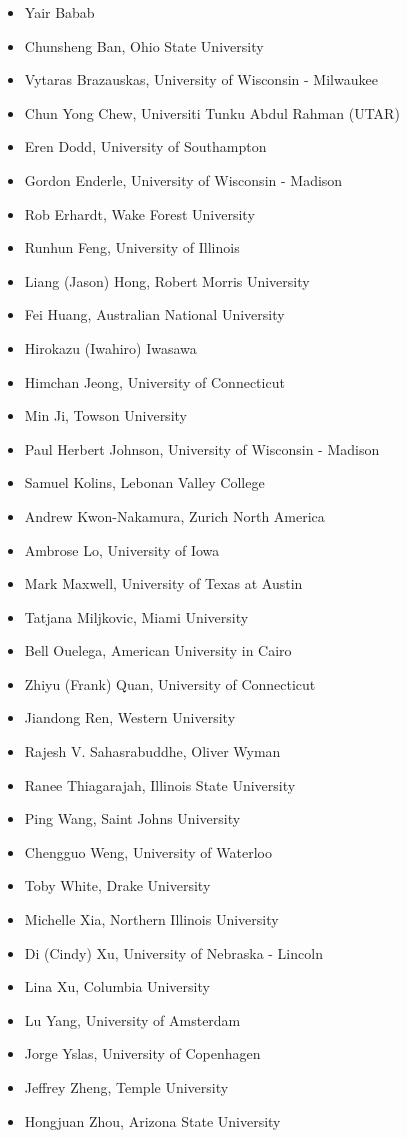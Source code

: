 \documentclass[]{book}
\providecommand{\tightlist}{%
  \setlength{\itemsep}{0pt}\setlength{\parskip}{0pt}}
\begin{document}
\begin{itemize}
\tightlist
\item
  Yair Babab
\item
  Chunsheng Ban, Ohio State University
\item
  Vytaras Brazauskas, University of Wisconsin - Milwaukee
\item
  Chun Yong Chew, Universiti Tunku Abdul Rahman (UTAR)
\item
  Eren Dodd, University of Southampton
\item
  Gordon Enderle, University of Wisconsin - Madison
\item
  Rob Erhardt, Wake Forest University
\item
  Runhun Feng, University of Illinois
\item
  Liang (Jason) Hong, Robert Morris University
\item
  Fei Huang, Australian National University
\item
  Hirokazu (Iwahiro) Iwasawa
\item
  Himchan Jeong, University of Connecticut
\item
  Min Ji, Towson University
\item
  Paul Herbert Johnson, University of Wisconsin - Madison
\item
  Samuel Kolins, Lebonan Valley College
\item
  Andrew Kwon-Nakamura, Zurich North America
\item
  Ambrose Lo, University of Iowa
\item
  Mark Maxwell, University of Texas at Austin
\item
  Tatjana Miljkovic, Miami University
\item
  Bell Ouelega, American University in Cairo
\item
  Zhiyu (Frank) Quan, University of Connecticut
\item
  Jiandong Ren, Western University
\item
  Rajesh V. Sahasrabuddhe, Oliver Wyman
\item
  Ranee Thiagarajah, Illinois State University
\item
  Ping Wang, Saint Johns University
\item
  Chengguo Weng, University of Waterloo
\item
  Toby White, Drake University
\item
  Michelle Xia, Northern Illinois University
\item
  Di (Cindy) Xu, University of Nebraska - Lincoln
\item
  Lina Xu, Columbia University
\item
  Lu Yang, University of Amsterdam
\item
  Jorge Yslas, University of Copenhagen
\item
  Jeffrey Zheng, Temple University
\item
  Hongjuan Zhou, Arizona State University
\end{itemize}
\end{document}

